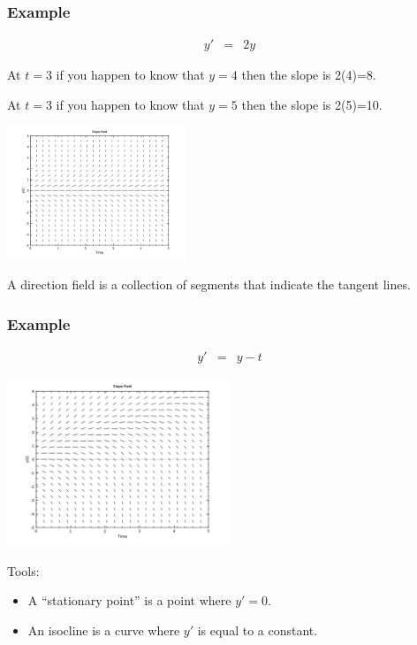 \begin{frame}
  \frametitle{Example}

  \vspace*{-4em}

  \begin{eqnarray*}
    y' & = & 2y
  \end{eqnarray*}

  At $t=3$ if you happen to know that $y=4$ then the slope is 2(4)=8.

  At $t=3$ if you happen to know that $y=5$ then the slope is 2(5)=10.

  \includegraphics[height=4cm]{img/week1Day2SlopeField}

  A direction field is a collection of segments that indicate the
  tangent lines. 
  
\end{frame}


\begin{frame}
  \frametitle{Example}

  \vspace*{-4em}

  \begin{eqnarray*}
    y' & = & y - t
  \end{eqnarray*}

  \includegraphics[height=5cm]{img/week1Day2SlopeField2}

  Tools:
  \begin{itemize}
  \item A ``stationary point'' is a point where $y'=0$.
  \item An isocline is a curve where $y'$ is equal to a constant.
  \end{itemize}

\end{frame}


